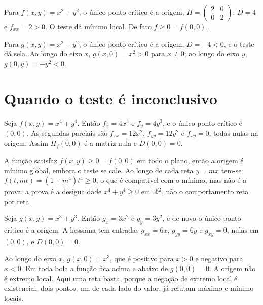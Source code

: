 \documentclass[11pt,a4paper]{article}
\begin{document}
\begin{exemplo}
Para $f(x,y)=x^2+y^2$, o único ponto crítico é a origem, $H=\begin{pmatrix}2&0\\0&2\end{pmatrix}$, $D=4$ e $f_{xx}=2>0$. O teste dá mínimo local. De fato $f\ge 0=f(0,0)$.

Para $g(x,y)=x^2-y^2$, o único ponto crítico é a origem, $D=-4<0$, e o teste dá sela. Ao longo do eixo $x$, $g(x,0)=x^2>0$ para $x\neq 0$; ao longo do eixo $y$, $g(0,y)=-y^2<0$.
\end{exemplo}

\section{Quando o teste é inconclusivo}


\begin{exemplo}
Seja $f(x,y)=x^4+y^4$. Então $f_x=4x^3$ e $f_y=4y^3$, e o único ponto crítico é $(0,0)$. As segundas parciais são $f_{xx}=12x^2$, $f_{yy}=12y^2$ e $f_{xy}=0$, todas nulas na origem. Assim $H_f(0,0)$ é a matriz nula e $D(0,0)=0$.

A função satisfaz $f(x,y)\ge 0=f(0,0)$ em todo o plano, então a origem é mínimo global, embora o teste se cale. Ao longo de cada reta $y=mx$ tem-se $f(t,mt)=(1+m^4)t^4\ge 0$, o que é compatível com o mínimo, mas não é a prova: a prova é a desigualdade $x^4+y^4\ge 0$ em $\mathbb{R}^2$, não o comportamento reta por reta.
\end{exemplo}

\begin{exemplo}
Seja $g(x,y)=x^3+y^3$. Então $g_x=3x^2$ e $g_y=3y^2$, e de novo o único ponto crítico é a origem. A hessiana tem entradas $g_{xx}=6x$, $g_{yy}=6y$ e $g_{xy}=0$, nulas em $(0,0)$, e $D(0,0)=0$.

Ao longo do eixo $x$, $g(x,0)=x^3$, que é positivo para $x>0$ e negativo para $x<0$. Em toda bola a função fica acima e abaixo de $g(0,0)=0$. A origem não é extremo local. Aqui uma reta basta, porque a negação de extremo local é existencial: dois pontos, um de cada lado do valor, já refutam máximo e mínimo locais.
\end{exemplo}
\end{document}
